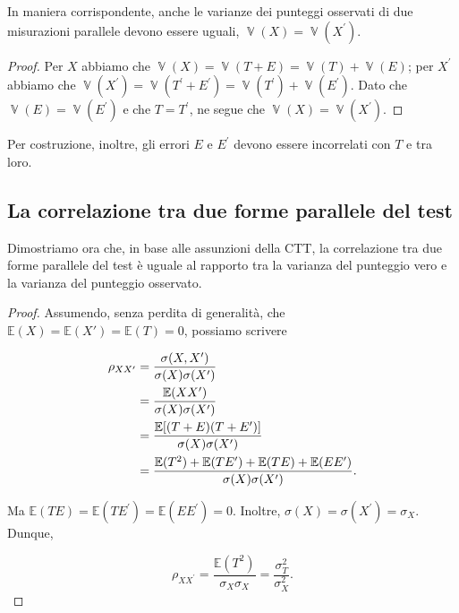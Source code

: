\documentclass[
  11pt,
]{krantz}
\DeclareMathOperator{\V}{\mathbb{V}} %
\newcommand{\E}{\mathbb{E}} %
\theoremstyle{definition}
\theoremstyle{definition}
\theoremstyle{definition}
\theoremstyle{definition}
\theoremstyle{remark}
\begin{document}
In maniera corrispondente, anche le varianze dei punteggi osservati di due misurazioni parallele devono essere uguali, \(\V(X) = \V(X^\prime)\).

\begin{proof}
Per \(X\) abbiamo che \(\V(X) = \V(T + E) = \V(T) + \V(E)\); per \(X^\prime\) abbiamo che \(\V(X^\prime) = \V(T^\prime + E^\prime) = \V(T^\prime) + \V(E^\prime)\). Dato che \(\V(E) = \V(E^\prime)\) e che \(T = T^\prime\), ne segue che \(\V(X) = \V(X^\prime)\).
\end{proof}

Per costruzione, inoltre, gli errori \(E\) e \(E^\prime\) devono essere incorrelati con \(T\) e tra loro.

\hypertarget{la-correlazione-tra-due-forme-parallele-del-test}{%
\subsection{La correlazione tra due forme parallele del test}\label{la-correlazione-tra-due-forme-parallele-del-test}}

Dimostriamo ora che, in base alle assunzioni della CTT, la correlazione tra due forme parallele del test è uguale al rapporto tra la varianza del punteggio vero e la varianza del punteggio osservato.

\begin{proof}
Assumendo, senza perdita di generalità, che \(\E(X)=\E(X')=\E(T)=0\), possiamo scrivere

\begin{equation}
\begin{aligned}
\rho_{X X^\prime} &= \frac{\sigma(X, X^\prime)}{\sigma(X) \sigma(X^\prime)}\notag\\
&= \frac{\E(XX^\prime)}{\sigma(X) \sigma(X^\prime)}\notag\\
&=\frac{\E[(T+E)(T+E^\prime)]}{\sigma(X) \sigma(X^\prime)}\notag\\
&=\frac{\E(T^2)+\E(TE^\prime)+\E(TE)+ \E(EE^\prime)}{\sigma(X) \sigma(X^\prime)}.\notag
\end{aligned}
\end{equation}

Ma \(\E(TE) = \E(TE^\prime) = \E(EE^\prime)=0\). Inoltre, \(\sigma(X) =\sigma(X^\prime)= \sigma_X\). Dunque,

\begin{equation}
\rho_{X X^\prime} =\frac{\E(T^2)}{\sigma_X \sigma_X} = \frac{\sigma^2_T}{\sigma^2_X}.
\label{eq:3-3-5}
\end{equation}
\end{proof}
\end{document}
